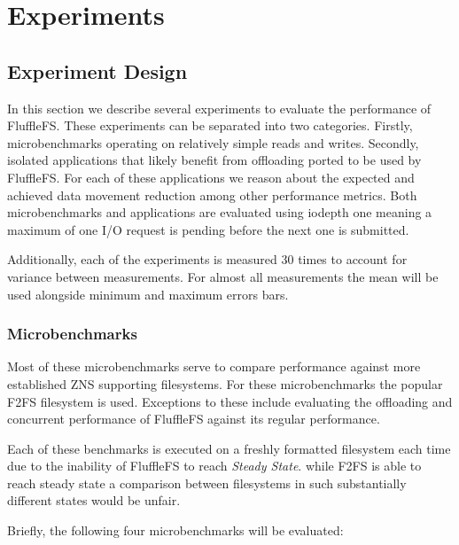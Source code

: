 
\chapter{Experiments} %


% 

\section{Experiment Design}

In this section we describe several experiments to evaluate the performance of
FluffleFS. These experiments can be separated into two categories. Firstly,
microbenchmarks operating on relatively simple reads and writes.
Secondly, isolated applications that likely benefit from offloading
ported to be used by FluffleFS. For each of these applications we reason
about the expected and achieved data movement reduction among other performance
metrics. Both microbenchmarks and applications are evaluated using iodepth one
meaning a maximum of one I/O request is pending before the next one is
submitted.

Additionally, each of the experiments is measured 30 times to account for
variance between measurements. For almost all measurements the mean will be used
alongside minimum and maximum errors bars.

\subsection{Microbenchmarks}

Most of these microbenchmarks serve to compare performance against more
established ZNS supporting filesystems. For these microbenchmarks the popular
F2FS \cite{Lee2015F2FSAN} filesystem is used. Exceptions to these include
evaluating the offloading and concurrent performance of FluffleFS against its
regular performance.

Each of these benchmarks is executed on a freshly formatted filesystem each
time due to the inability of FluffleFS to reach \textit{Steady State}. while
F2FS is able to reach steady state a comparison between filesystems in such
substantially different states would be unfair.

Briefly, the following four microbenchmarks will be evaluated:

